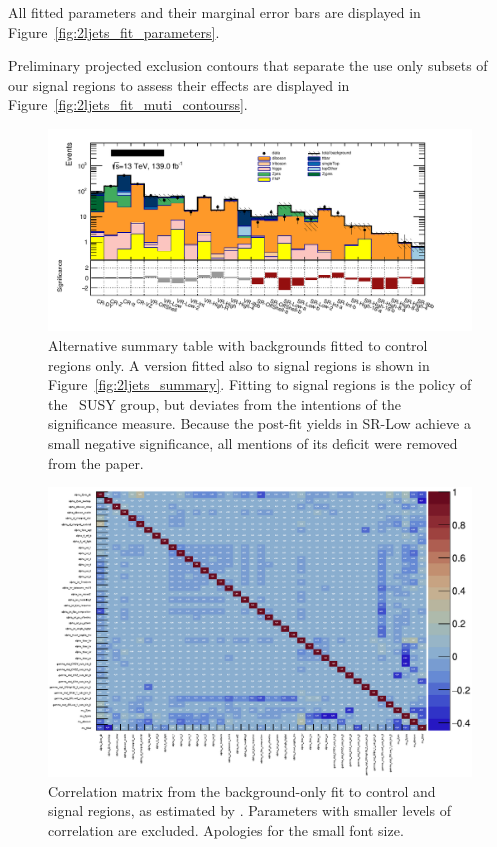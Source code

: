 All fitted parameters and their marginal error bars are displayed in
Figure~\ref{fig:2ljets_fit_parameters}.

Preliminary projected exclusion contours that separate the use only subsets
of our signal regions to assess their effects are displayed in
Figure~\ref{fig:2ljets_fit_muti_contourss}.

\begin{figure}[tp]
\centering
\includegraphics[width=\textwidth]{figures/2ljets_summary_no_sr_log.png}
\caption[
Alternative summary table with backgrounds fitted to control regions only
]{%
Alternative summary table with backgrounds fitted to control regions only.
A version fitted also to signal regions is shown in
Figure~\ref{fig:2ljets_summary}.
Fitting to signal regions is the policy of the \atlas\ SUSY group, but deviates
from the intentions of the significance measure.
Because the post-fit yields in SR-Low achieve a small negative significance,
all mentions of its deficit were removed from the paper.
}
\label{fig:2ljets_summary_no_sr}
\end{figure}

\begin{figure}[tp]
\centering
\includegraphics[width=\textwidth]{figures/2ljets_fit_corrmatrix.pdf}
\caption[
Correlation matrix from the background-only fit to control and signal regions
]{%
Correlation matrix from the background-only fit to control and signal regions,
as estimated by \histfitter.
Parameters with smaller levels of correlation are excluded.
Apologies for the small font size.
}
\label{fig:2ljets_fit_corrmatrix}
\end{figure}

